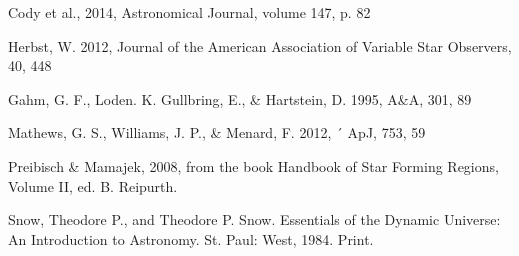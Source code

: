 \documentclass[onecolumn]{aastex6}
\begin{document}
\begin{thebibliography}{}


Cody et al., 2014, Astronomical Journal, volume 147, p. 82

Herbst, W. 2012, Journal of the American Association of Variable Star Observers, 40, 448

Gahm, G. F., Loden. K. Gullbring, E., \& Hartstein, D. 1995, A\&A, 301, 89 

Mathews, G. S., Williams, J. P., \& Menard, F. 2012, ´ ApJ, 753, 59

Preibisch \& Mamajek, 2008, from the book Handbook of Star Forming Regions, Volume II, ed. B. Reipurth.



Snow, Theodore P., and Theodore P. Snow. Essentials of the Dynamic Universe: An Introduction to Astronomy. St. Paul: West, 1984. Print.


\end{thebibliography}






\end{document}
